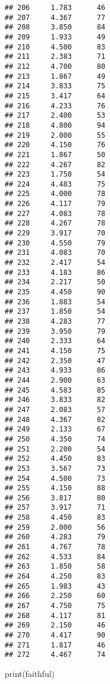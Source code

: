 \documentclass[
]{book}
\newenvironment{Shaded}{\begin{snugshade}}{\end{snugshade}}
\newcommand{\FunctionTok}[1]{\textcolor[rgb]{0.00,0.00,0.00}{#1}}
\newcommand{\NormalTok}[1]{#1}
\begin{document}
\begin{verbatim}
## 206     1.783      46
## 207     4.367      77
## 208     3.850      84
## 209     1.933      49
## 210     4.500      83
## 211     2.383      71
## 212     4.700      80
## 213     1.867      49
## 214     3.833      75
## 215     3.417      64
## 216     4.233      76
## 217     2.400      53
## 218     4.800      94
## 219     2.000      55
## 220     4.150      76
## 221     1.867      50
## 222     4.267      82
## 223     1.750      54
## 224     4.483      75
## 225     4.000      78
## 226     4.117      79
## 227     4.083      78
## 228     4.267      78
## 229     3.917      70
## 230     4.550      79
## 231     4.083      70
## 232     2.417      54
## 233     4.183      86
## 234     2.217      50
## 235     4.450      90
## 236     1.883      54
## 237     1.850      54
## 238     4.283      77
## 239     3.950      79
## 240     2.333      64
## 241     4.150      75
## 242     2.350      47
## 243     4.933      86
## 244     2.900      63
## 245     4.583      85
## 246     3.833      82
## 247     2.083      57
## 248     4.367      82
## 249     2.133      67
## 250     4.350      74
## 251     2.200      54
## 252     4.450      83
## 253     3.567      73
## 254     4.500      73
## 255     4.150      88
## 256     3.817      80
## 257     3.917      71
## 258     4.450      83
## 259     2.000      56
## 260     4.283      79
## 261     4.767      78
## 262     4.533      84
## 263     1.850      58
## 264     4.250      83
## 265     1.983      43
## 266     2.250      60
## 267     4.750      75
## 268     4.117      81
## 269     2.150      46
## 270     4.417      90
## 271     1.817      46
## 272     4.467      74
\end{verbatim}

\begin{Shaded}
\begin{Highlighting}[]
\FunctionTok{print}\NormalTok{(faithful)}
\end{Highlighting}
\end{Shaded}
\end{document}
